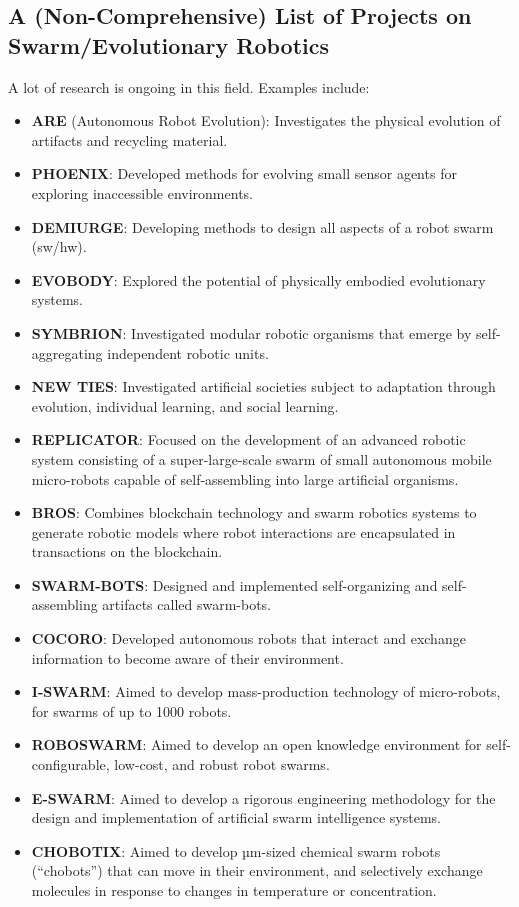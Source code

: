 \subsection*{A (Non-Comprehensive) List of Projects on Swarm/Evolutionary Robotics}
A lot of research is ongoing in this field.
Examples include:
\begin{itemize}
    \item \textbf{ARE} (Autonomous Robot Evolution): Investigates the physical evolution of artifacts and recycling material.
    \item \textbf{PHOENIX}: Developed methods for evolving small sensor agents for exploring inaccessible environments.
    \item \textbf{DEMIURGE}: Developing methods to design all aspects of a robot swarm (sw/hw).
    \item \textbf{EVOBODY}: Explored the potential of physically embodied evolutionary systems.
    \item \textbf{SYMBRION}: Investigated modular robotic organisms that emerge by self-aggregating independent robotic units.
     \item \textbf{NEW TIES}: Investigated artificial societies subject to adaptation through evolution, individual learning, and social learning.
   \item \textbf{REPLICATOR}: Focused on the development of an advanced robotic system consisting of a super-large-scale swarm of small autonomous mobile micro-robots capable of self-assembling into large artificial organisms.
   \item  \textbf{BROS}: Combines blockchain technology and swarm robotics systems to generate robotic models where robot interactions are encapsulated in transactions on the blockchain.
    \item \textbf{SWARM-BOTS}: Designed and implemented self-organizing and self-assembling artifacts called swarm-bots.
   \item \textbf{COCORO}: Developed autonomous robots that interact and exchange information to become aware of their environment.
   \item  \textbf{I-SWARM}: Aimed to develop mass-production technology of micro-robots, for swarms of up to 1000 robots.
    \item  \textbf{ROBOSWARM}: Aimed to develop an open knowledge environment for self-configurable, low-cost, and robust robot swarms.
    \item \textbf{E-SWARM}: Aimed to develop a rigorous engineering methodology for the design and implementation of artificial swarm intelligence systems.
    \item  \textbf{CHOBOTIX}: Aimed to develop µm-sized chemical swarm robots (“chobots”) that can move in their environment, and selectively exchange molecules in response to changes in temperature or concentration.
\end{itemize}


